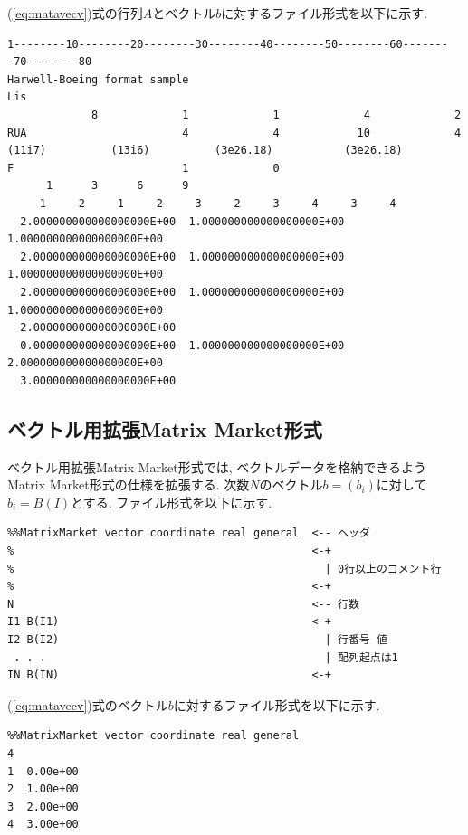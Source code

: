 \documentclass[a4paper]{jarticle}
\begin{document}
{{(\ref{eq:matavecv})式の行列$A$とベクトル$b$に対するファイル形式を以下に示す.

{\small
\begin{verbatim}
1--------10--------20--------30--------40--------50--------60--------70--------80
Harwell-Boeing format sample                                            Lis
             8             1             1             4             2
RUA                        4             4            10             4
(11i7)          (13i6)          (3e26.18)           (3e26.18)
F                          1             0
      1      3      6      9
     1     2     1     2     3     2     3     4     3     4
  2.000000000000000000E+00  1.000000000000000000E+00  1.000000000000000000E+00
  2.000000000000000000E+00  1.000000000000000000E+00  1.000000000000000000E+00
  2.000000000000000000E+00  1.000000000000000000E+00  1.000000000000000000E+00
  2.000000000000000000E+00
  0.000000000000000000E+00  1.000000000000000000E+00  2.000000000000000000E+00
  3.000000000000000000E+00
\end{verbatim}
}

\subsection{ベクトル用拡張Matrix Market形式}
ベクトル用拡張Matrix Market形式では, 
ベクトルデータを格納できるようMatrix Market形式の仕様を拡張する. 
次数$N$のベクトル$b=(b_{i})$に対して$b_{i} = B(I)$とする. 
ファイル形式を以下に示す.

{\small
\begin{verbatim}
%%MatrixMarket vector coordinate real general  <-- ヘッダ
%                                              <-+ 
%                                                | 0行以上のコメント行
%                                              <-+
N                                              <-- 行数
I1 B(I1)                                       <-+
I2 B(I2)                                         | 行番号 値
 . . .                                           | 配列起点は1
IN B(IN)                                       <-+ 
\end{verbatim}
}

(\ref{eq:matavecv})式のベクトル$b$に対するファイル形式を以下に示す.

{\small
\begin{verbatim}
%%MatrixMarket vector coordinate real general
4
1  0.00e+00
2  1.00e+00
3  2.00e+00
4  3.00e+00
\end{verbatim}
}

}}
\end{document}
